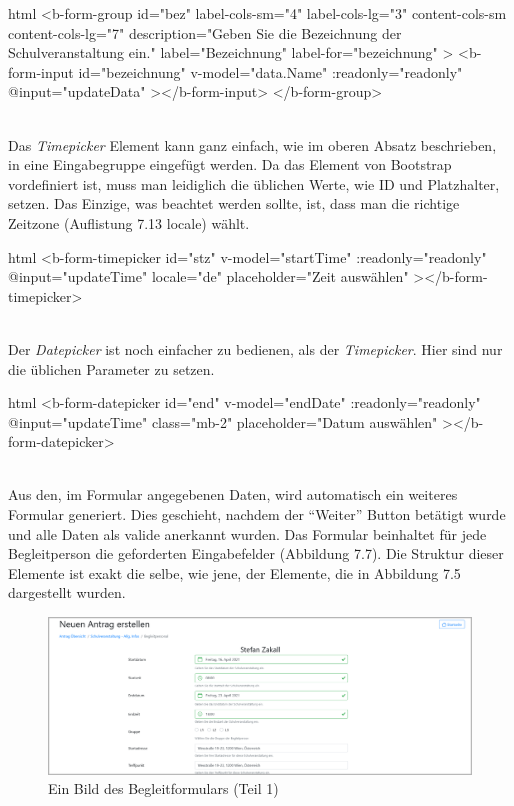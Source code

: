 \begin{code}{html}
	<b-form-group
        id="bez"
        label-cols-sm="4"
        label-cols-lg="3"
        content-cols-sm
        content-cols-lg="7"
        description="Geben Sie die Bezeichnung der Schulveranstaltung ein."
        label="Bezeichnung"
        label-for="bezeichnung"
    >
        <b-form-input
            id="bezeichnung"
            v-model="data.Name"
            :readonly="readonly"
            @input="updateData"
        ></b-form-input>
    </b-form-group>
\end{code}
~\\
Das \textit{Timepicker} Element kann ganz einfach, wie im oberen Absatz beschrieben, in eine Eingabegruppe eingefügt werden. Da das Element von Bootstrap vordefiniert ist, muss man leidiglich die üblichen Werte, wie ID und Platzhalter, setzen. Das Einzige, was beachtet werden sollte, ist, dass man die richtige Zeitzone (Auflistung 7.13 locale) wählt.
\begin{code}{html}
	<b-form-timepicker
		id="stz"
		v-model="startTime"
		:readonly="readonly"
		@input="updateTime"
		locale="de"
		placeholder="Zeit auswählen"
  	></b-form-timepicker>
\end{code}
~\\
Der \textit{Datepicker} ist noch einfacher zu bedienen, als der \textit{Timepicker}. Hier sind nur die üblichen Parameter zu setzen.
\begin{code}{html}
	<b-form-datepicker
		id="end"
		v-model="endDate"
		:readonly="readonly"
		@input="updateTime"
		class="mb-2"
		placeholder="Datum auswählen"
  	></b-form-datepicker>
\end{code}
	\label{list:bspinputgroup} ~\\
Aus den, im Formular angegebenen Daten, wird automatisch ein weiteres Formular generiert. Dies geschieht, nachdem der \enquote{Weiter} Button betätigt wurde und alle Daten als valide anerkannt wurden. Das Formular beinhaltet für jede Begleitperson die geforderten Eingabefelder (Abbildung 7.7). Die Struktur dieser Elemente ist exakt die selbe, wie jene, der Elemente, die in Abbildung 7.5 dargestellt wurden. 
\begin{figure}[H]
	\centering
	\includegraphics[width=1\linewidth]{images/website/schul_3_1}
	\caption[Neuer Schulantrag]{Ein Bild des Begleitformulars (Teil 1)}
	\label{fig:schulantrag3}
\end{figure}
